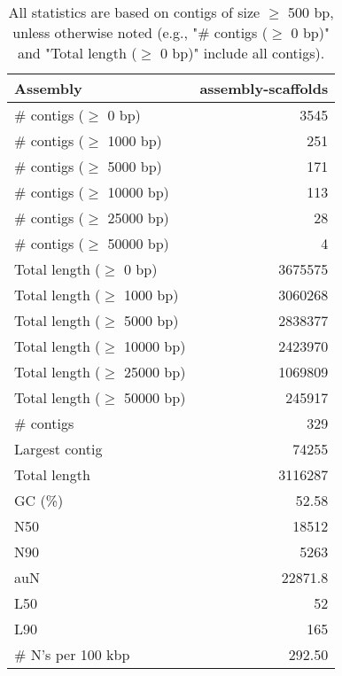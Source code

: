 \documentclass[12pt,a4paper]{article}
\begin{document}
\begin{table}[ht]
\begin{center}
\caption{All statistics are based on contigs of size $\geq$ 500 bp, unless otherwise noted (e.g., "\# contigs ($\geq$ 0 bp)" and "Total length ($\geq$ 0 bp)" include all contigs).}
\begin{tabular}{|l*{1}{|r}|}
\hline
Assembly & assembly-scaffolds \\ \hline
\# contigs ($\geq$ 0 bp) & 3545 \\ \hline
\# contigs ($\geq$ 1000 bp) & 251 \\ \hline
\# contigs ($\geq$ 5000 bp) & 171 \\ \hline
\# contigs ($\geq$ 10000 bp) & 113 \\ \hline
\# contigs ($\geq$ 25000 bp) & 28 \\ \hline
\# contigs ($\geq$ 50000 bp) & 4 \\ \hline
Total length ($\geq$ 0 bp) & 3675575 \\ \hline
Total length ($\geq$ 1000 bp) & 3060268 \\ \hline
Total length ($\geq$ 5000 bp) & 2838377 \\ \hline
Total length ($\geq$ 10000 bp) & 2423970 \\ \hline
Total length ($\geq$ 25000 bp) & 1069809 \\ \hline
Total length ($\geq$ 50000 bp) & 245917 \\ \hline
\# contigs & 329 \\ \hline
Largest contig & 74255 \\ \hline
Total length & 3116287 \\ \hline
GC (\%) & 52.58 \\ \hline
N50 & 18512 \\ \hline
N90 & 5263 \\ \hline
auN & 22871.8 \\ \hline
L50 & 52 \\ \hline
L90 & 165 \\ \hline
\# N's per 100 kbp & 292.50 \\ \hline
\end{tabular}
\end{center}
\end{table}
\end{document}
